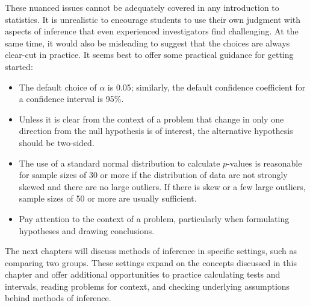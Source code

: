 
These nuanced issues cannot be adequately covered in any introduction to statistics. It is unrealistic to encourage students to use their own judgment with aspects of inference that even experienced investigators find challenging. At the same time, it would also be misleading to suggest that the choices are always clear-cut in practice. It seems best to offer some practical guidance for getting started:

\begin{itemize}
	\item The default choice of $\alpha$ is 0.05; similarly, the default confidence coefficient for a confidence interval is 95\%. 
	
	\item Unless it is clear from the context of a problem that change in only one direction from the null hypothesis is of interest, the alternative hypothesis should be two-sided.
	
	\item The use of a standard normal distribution to calculate $p$-values is reasonable for sample sizes of 30 or more if the distribution of data are not strongly skewed and there are no large outliers. If there is skew or a few large outliers, sample sizes of 50 or more are usually sufficient.
	
	\item Pay attention to the context of a problem, particularly when formulating hypotheses and drawing conclusions.
\end{itemize}

The next chapters will discuss methods of inference in specific settings, such as comparing two groups. These settings expand on the concepts discussed in this chapter and offer additional opportunities to practice calculating tests and intervals, reading problems for context, and checking underlying assumptions behind methods of inference.


